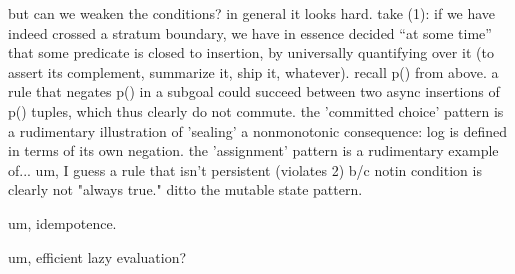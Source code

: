 but can we weaken the conditions?  in general it looks hard.  take (1): if we have indeed crossed a stratum boundary, we have in essence decided ``at some time'' that some predicate is closed to insertion, by universally quantifying over it (to assert its complement, summarize it, ship it, whatever).  recall p() from above.  a rule that negates p() in a subgoal could succeed between 
two async insertions of p() tuples, which thus clearly do not commute.  the 'committed choice'
pattern is a rudimentary illustration of 'sealing' a nonmonotonic consequence: log is defined 
in terms of its own negation.  the 'assignment' pattern is a rudimentary example of... um, I guess a rule that isn't persistent (violates 2) b/c notin condition is clearly not "always true."  ditto the
mutable state pattern.




um, idempotence.

um, efficient lazy evaluation?  \cite{magic}
